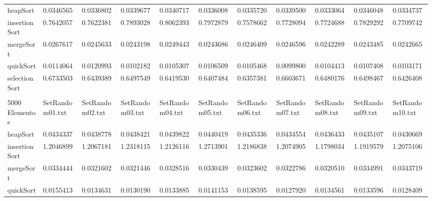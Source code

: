 \documentclass[article,a4paper]{article}
\begin{document}
\begin{table}[h]
{\begin{tabular}{lllllllllll}
heapSort        & 0.0346565       & 0.0336802       & 0.0339677       & 0.0340717       & 0.0336008       & 0.0335720       & 0.0339500       & 0.0333064       & 0.0346048       & 0.0334737       \\
insertionSort   & 0.7642057       & 0.7622381       & 0.7893028       & 0.8062393       & 0.7972879       & 0.7578662       & 0.7728094       & 0.7724688       & 0.7829292       & 0.7709742       \\
mergeSort       & 0.0267617       & 0.0245633       & 0.0243198       & 0.0249443       & 0.0243686       & 0.0246409       & 0.0246596       & 0.0242289       & 0.0243485       & 0.0242665       \\
quickSort       & 0.0114064       & 0.0120993       & 0.0102182       & 0.0105307       & 0.0106509       & 0.0105468       & 0.0099800       & 0.0104413       & 0.0107408       & 0.0103171       \\
selectionSort   & 0.6733503       & 0.6439389       & 0.6497549       & 0.6419530       & 0.6407484       & 0.6357381       & 0.6603671       & 0.6480176       & 0.6498467       & 0.6426408       \\
                &                 &                 &                 &                 &                 &                 &                 &                 &                 &                 \\
5000 Elementos  & SetRandom01.txt & SetRandom02.txt & SetRandom03.txt & SetRandom04.txt & SetRandom05.txt & SetRandom06.txt & SetRandom07.txt & SetRandom08.txt & SetRandom09.txt & SetRandom10.txt \\
heapSort        & 0.0434337       & 0.0438778       & 0.0438421       & 0.0439822       & 0.0440419       & 0.0435336       & 0.0434554       & 0.0436433       & 0.0435107       & 0.0430669       \\
insertionSort   & 1.2046899       & 1.2067181       & 1.2318115       & 1.2126116       & 1.2713901       & 1.2186838       & 1.2074905       & 1.1798034       & 1.1919579       & 1.2075106       \\
mergeSort       & 0.0334444       & 0.0321602       & 0.0321446       & 0.0328516       & 0.0330439       & 0.0323602       & 0.0322786       & 0.0320510       & 0.0334991       & 0.0343719       \\
quickSort       & 0.0155413       & 0.0134631       & 0.0130190       & 0.0133885       & 0.0141153       & 0.0138595       & 0.0127920       & 0.0134561       & 0.0133596       & 0.0128409       \\

\end{tabular}}
\end{table}
\end{document}
